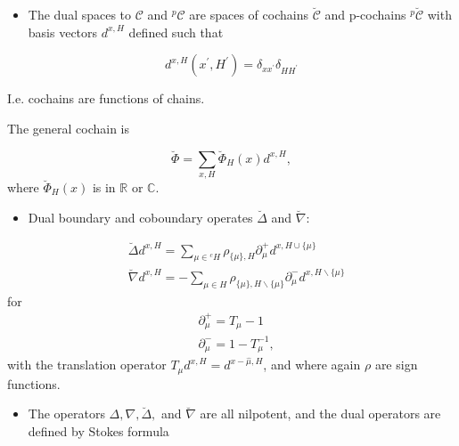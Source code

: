 \begin{itemize}
  \item The dual spaces to \(\mathcal{C}\) and \({ }^{p} \mathcal{C}\) are spaces of cochains \(\breve{\mathcal{C}}\) and p-cochains \({}^p{\breve{\mathcal{C}}}\) with basis vectors \(d^{x, H}\) defined such that
\end{itemize}

\begin{equation}
d^{x, H}\left(x^{\prime}, H^{\prime}\right)=\delta_{x x^{\prime}} \delta_{H H^{\prime}}
\end{equation}

I.e. cochains are functions of chains.

The general cochain is

\begin{equation}
\breve{\Phi}=\sum_{x, H} \breve{\Phi}_{H}(x) d^{x, H},
\end{equation}
where $\breve{\Phi}_H(x)$ is in $\mathbb{R}$ or $\mathbb{C}$.

\begin{itemize}
  \item Dual boundary and coboundary operates \(\breve{\Delta}\) and $\breve{\nabla}$:
\end{itemize}

\begin{equation}
\begin{aligned}
& \breve{\Delta} d^{x, H}=\sum_{\mu \in {}^c H} {\rho_{\{\mu\}, H}} \partial_{\mu}^{+} d^{x, H \cup\{\mu\}} \\
& \breve{\nabla}d^{x,H} = - \sum_{\mu \in H} \rho_{\{\mu\}, H \backslash \{\mu \}} \partial_\mu^- d^{x, H \backslash \{ \mu\} }
\end{aligned}
\end{equation}
for
\begin{equation}
\begin{aligned}
    &\partial_\mu^+ = T_\mu - 1 \\
    &\partial_\mu^- = 1 - T_\mu^{-1},
\end{aligned}
\end{equation}
with the translation operator $T_\mu d^{x,H} = d^{{x - \hat{\mu}},H}$, and where again $\rho$ are sign functions.
\begin{itemize}
    \item The operators $\Delta, \nabla, \breve{\Delta},$ and $\breve{\nabla}$ are all nilpotent, and the dual operators are defined by Stokes formula
\end{itemize}

